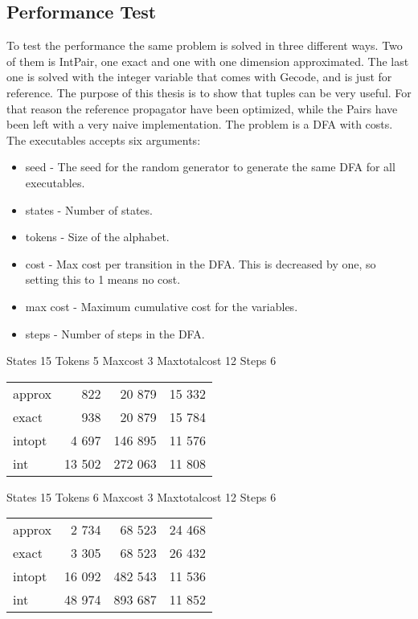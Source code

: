 \documentclass[a4paper,11pt]{article}
\begin{document}
\subsection{Performance Test}
To test the performance the same problem is solved in three different ways. Two of them is IntPair, one exact and one with one dimension approximated. The last one is solved with the integer variable that comes with Gecode, and is just for reference. The purpose of this thesis is to show that tuples can be very useful. For that reason the reference propagator have been optimized, while the Pairs have been left with a very naive implementation. The problem is a DFA with costs. The executables accepts six arguments: 
\begin{itemize}
\item{seed} - The seed for the random generator to generate the same DFA for all executables.
\item{states} - Number of states.
\item{tokens} - Size of the alphabet.
\item{cost} - Max cost per transition in the DFA. This is decreased by one, so setting this to 1 means no cost.
\item{max cost} - Maximum cumulative cost for the variables.
\item{steps} - Number of steps in the DFA.
\end{itemize}

\begin{table}
States 15 Tokens 5 Maxcost 3 Maxtotalcost 12 Steps 6 \\
\begin{tabular}{l r r r}
approx & 822 & 20 879 & 15 332 \\
exact & 938 & 20 879 & 15 784 \\
intopt & 4 697 & 146 895 & 11 576 \\
int & 13 502 & 272 063 & 11 808 \\
\end{tabular}
\end{table}

\begin{table}
States 15 Tokens 6 Maxcost 3 Maxtotalcost 12 Steps 6 \\
\begin{tabular}{l r r r}
approx & 2 734 & 68 523 & 24 468 \\
exact & 3 305 & 68 523 & 26 432 \\
intopt & 16 092 & 482 543 & 11 536 \\
int & 48 974 & 893 687 & 11 852 \\
\end{tabular}
\end{table}
\end{document}
